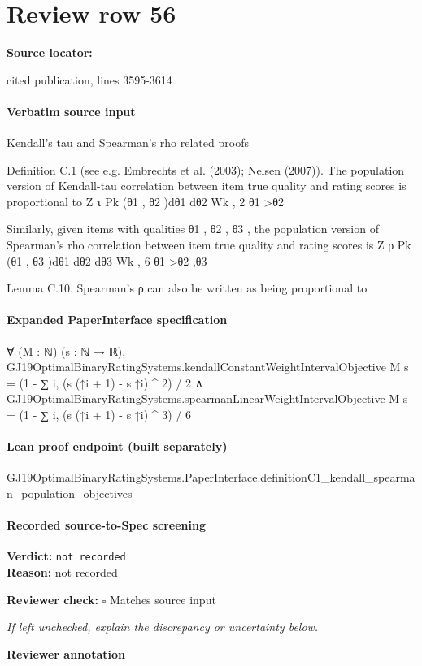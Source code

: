 \documentclass[10pt]{article}
\newcommand{\reviewerbox}{%
  \par\noindent\fbox{\parbox{0.96\linewidth}{\rule{0pt}{0.38in}}}\par
}
\newcommand{\reviewmatch}[1]{%
  \par\noindent\textbf{Reviewer check:} $\square$\; #1\par
  \noindent\emph{If left unchecked, explain the discrepancy or uncertainty below.}\par
}
\begin{document}
\section*{Review row 56}
\textbf{Source locator:} {\footnotesize\raggedright cited publication, lines 3595-\allowbreak{}3614\par}
\paragraph{Verbatim source input}
\begin{ReviewVerbatim}
Kendall’s tau and Spearman’s rho related proofs

Definition C.1 (see e.g. Embrechts et al. (2003); Nelsen (2007)). The population version of
Kendall-tau correlation between item true quality and rating scores is proportional to
Z
τ
Pk (θ1 , θ2 )dθ1 dθ2
Wk , 2
θ1 >θ2

Similarly, given items with qualities θ1 , θ2 , θ3 , the population version of Spearman’s rho correlation
between item true quality and rating scores is
Z
ρ
Pk (θ1 , θ3 )dθ1 dθ2 dθ3
Wk , 6
θ1 >θ2 ,θ3

Lemma C.10. Spearman’s ρ can also be written as being proportional to
\end{ReviewVerbatim}


\paragraph{Expanded PaperInterface specification}
\begin{ReviewVerbatim}
∀ (M : ℕ) (s : ℕ → ℝ),
  GJ19OptimalBinaryRatingSystems.kendallConstantWeightIntervalObjective M s = (1 - ∑ i, (s (↑i + 1) - s ↑i) ^ 2) / 2 ∧
    GJ19OptimalBinaryRatingSystems.spearmanLinearWeightIntervalObjective M s = (1 - ∑ i, (s (↑i + 1) - s ↑i) ^ 3) / 6
\end{ReviewVerbatim}

\paragraph{Lean proof endpoint (built separately)}\begin{ReviewVerbatim}
GJ19OptimalBinaryRatingSystems.PaperInterface.definitionC1_kendall_spearman_population_objectives
\end{ReviewVerbatim}

\paragraph{Recorded source-to-Spec screening}
\textbf{Verdict:} \texttt{not recorded}
\\
\textbf{Reason:} not recorded
\reviewmatch{Matches source input}
\noindent\textbf{Reviewer annotation}\par
\reviewerbox
\clearpage
\hypertarget{source-claim-3b01d7ad0b5d48f9}{}
\end{document}
